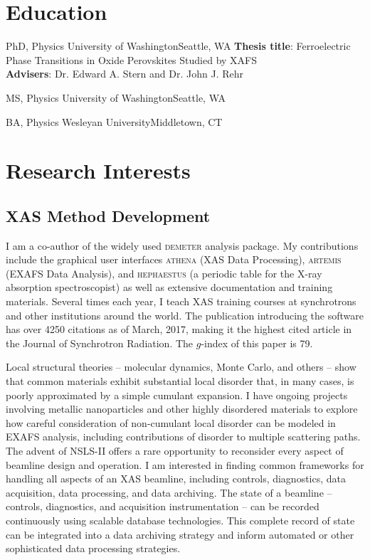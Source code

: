 \documentclass[11pt]{moderncv}
\begin{document}
\section{Education}
        {PhD, Physics}
        {University of Washington}{Seattle, WA}{}
        {\textbf{Thesis title}: Ferroelectric Phase Transitions in Oxide
          Perovskites Studied by XAFS\\
          \textbf{Advisers}: Dr. Edward A. Stern and Dr. John J. Rehr}  %

        {MS, Physics}
        {University of Washington}{Seattle, WA}{}{}

        {BA, Physics}
        {Wesleyan University}{Middletown, CT}{}{}

\pagebreak
\section{Research Interests}

\subsection{XAS Method Development}
%
{I am a co-author of the widely used \textsc{demeter} analysis
  package.  My contributions include the graphical user interfaces
  \textsc{athena} (XAS Data Processing), \textsc{artemis} (EXAFS Data
  Analysis), and \textsc{hephaestus} (a periodic table for the X-ray
  absorption spectroscopist) as well as extensive documentation and
  training materials.  Several times each year, I teach XAS training
  courses at synchrotrons and other institutions around the
  world. \newline{} The publication introducing the software has over
  4250 citations as of March, 2017, making it the highest cited
  article in the Journal of Synchrotron Radiation.  The $g$-index of
  this paper is 79.}

%
{Local structural theories -- molecular dynamics, Monte Carlo,
  and others -- show that common materials exhibit substantial local
  disorder that, in many cases, is poorly approximated by a simple
  cumulant expansion.  I have ongoing projects involving metallic
  nanoparticles and other highly disordered materials to explore how
  careful consideration of non-cumulant local disorder can be modeled
  in EXAFS analysis, including contributions of disorder to multiple
  scattering paths.}
%
%
{The advent of NSLS-II offers a rare opportunity to reconsider every
  aspect of beamline design and operation.  I am interested in finding
  common frameworks for handling all aspects of an XAS beamline,
  including controls, diagnostics, data acquisition, data processing,
  and data archiving.  The state of a beamline -- controls,
  diagnostics, and acquisition instrumentation -- can be recorded
  continuously using scalable database technologies.  This complete
  record of state can be integrated into a data archiving strategy and
  inform automated or other sophisticated data processing strategies.}
\end{document}
